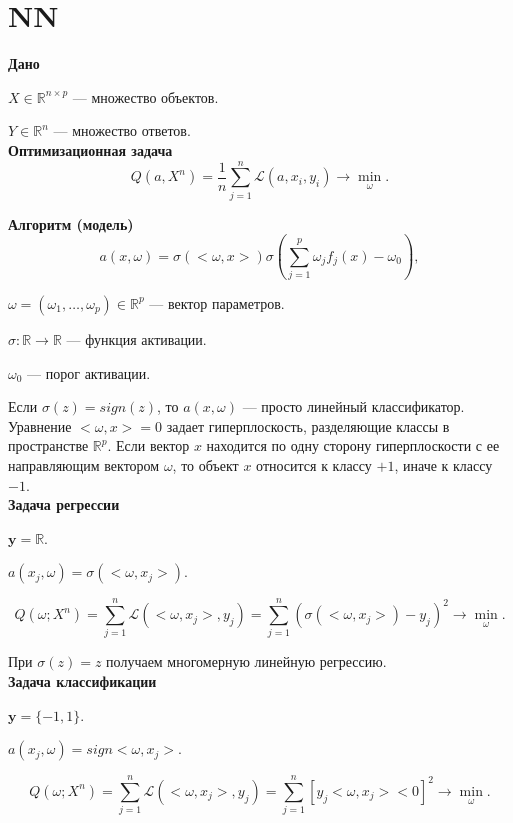 \documentclass{article}
\begin{document}
	
	\tableofcontents
	
	\newpage
	
	\section{NN}
	
	\textbf{Дано}
	
	$X \in \mathbb R ^{n \times p}$ --- множество объектов.
	
	$Y \in \mathbb{R}^n$ --- множество ответов.\\

	\textbf{Оптимизационная задача}
	$$Q(a, X^n) = \dfrac{1}{n} \sum\limits_{j=1}^n \mathcal{L} (a, x_i, y_i) \to \min_{\omega}.$$
	
	\textbf{Алгоритм (модель)}
	$$a(x, \omega) = \sigma \left( <\omega, x> \right) \sigma \left( \sum\limits_{j=1}^{p} \omega_j f_j(x) - \omega_0 \right),$$

	$\omega = (\omega_1, \ldots, \omega_p) \in \mathbb{R}^p$ --- вектор параметров.
	
	$\sigma: \mathbb{R} \to \mathbb{R}$ --- функция активации.
	
	$\omega_0$ --- порог активации.
	
	Если $\sigma(z) = sign(z)$, то $a(x, \omega)$ --- просто линейный классификатор. Уравнение $<\omega, x> = 0$ задает гиперплоскость, разделяющие классы в пространстве $\mathbb{R}^p$. Если вектор $x$ находится по одну сторону гиперплоскости с ее направляющим вектором $\omega$, то объект $x$ относится к классу $+1$, иначе к классу $-1$.\\
	
	\textbf{Задача регрессии}
	
	$\textbf{y} = \mathbb{R}.$
	
	$a(x_j, \omega) = \sigma(<\omega, x_j>).$

	$$Q(\omega; X^n) =  \sum\limits_{j=1}^{n} \mathcal{L} (<\omega, x_j>, y_j) = \sum\limits_{j=1}^{n} \left( \sigma (<\omega, x_j>) - y_j \right)^2 \to \min_{\omega}.$$
	
	При $\sigma(z) = z$ получаем многомерную линейную регрессию.\\
	
	\textbf{Задача классификации}
	
	$\textbf{y} = \{-1, 1\}.$
	
	$a(x_j, \omega) = sign <\omega, x_j>.$
	
	$$Q(\omega; X^n) =  \sum\limits_{j=1}^{n} \mathcal{L} (<\omega, x_j>, y_j) = \sum\limits_{j=1}^{n} \left[ y_j <\omega, x_j> < 0 \right]^2 \to \min_{\omega}.$$
	
\end{document}
